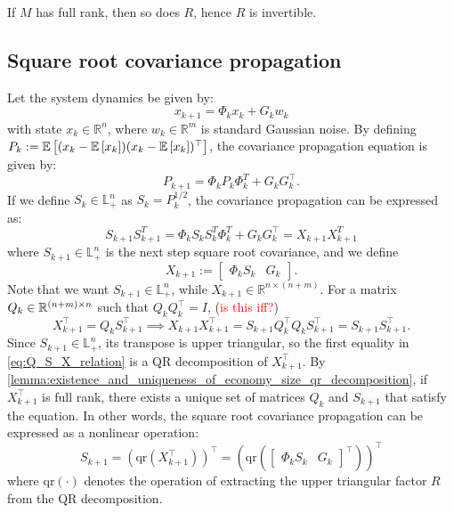 \documentclass{IEEEtran}
\begin{document}
\begin{remark}
	If \(M\) has full rank, then so does \(R\), hence \(R\) is invertible.
\end{remark}

\subsection{Square root covariance propagation}%
Let the system dynamics be given by:
\begin{equation}
	x_{k+1} = \Phi_k x_k + G_k w_k
\end{equation}
with state \( x_k \in \mathbb{R}^n \), where \( w_k \in \mathbb{R}^m \) is standard Gaussian noise.
By defining $P_k := \mathbb{E}\left[(x_k - \mathbb{E}\left[x_k\right])(x_k - \mathbb{E}\left[x_k\right])^\top\right]$, the covariance propagation equation is given by:
\begin{equation}
	P_{k+1} = \Phi_k P_k \Phi_k^T + G_k G_k^\top.
\end{equation}
If we define \( S_k \in \mathbb{L}_+^n \) as \( S_k = P_k^{1/2} \), the covariance propagation can be expressed as:
\begin{equation}
	S_{k+1} S_{k+1}^T = \Phi_k S_k S_k^T \Phi_k^T + G_k G_k^\top = X_{k+1} X_{k+1}^T
\end{equation}
where $S_{k+1} \in \mathbb{L}_+^n$ is the next step square root covariance, and we define
\begin{equation}
	X_{k+1} := \begin{bmatrix} \Phi_k S_k & G_k \end{bmatrix}.
\end{equation}
Note that we want $S_{k+1} \in \mathbb{L}_+^n$, while $X_{k+1} \in \mathbb{R}^{n \times (n+m)}$.
For a matrix $Q_{k} \in \mathbb{R}^{(n+m) \times n}$ such that $Q_{k} Q_{k}^\top = I$, (\textcolor{red}{is this iff?})
\begin{equation} \label{eq:Q_S_X_relation}
     X_{k+1}^\top = Q_{k} S_{k+1}^\top
	\implies
	X_{k+1} X_{k+1}^\top = S_{k+1} Q_{k}^\top Q_{k} S_{k+1}^\top = S_{k+1} S_{k+1}^\top.
\end{equation}
Since $S_{k+1} \in \mathbb{L}_+^n$, its transpose is upper triangular, so the first equality in \cref{eq:Q_S_X_relation} is a QR decomposition of $X_{k+1}^\top$. By \cref{lemma:existence_and_uniqueness_of_economy_size_qr_decomposition}, if $X_{k+1}^\top$ is full rank, there exists a unique set of matrices $Q_{k}$ and $S_{k+1}$ that satisfy the equation.
In other words, the square root covariance propagation can be expressed as a nonlinear operation:
\begin{equation} \label{eq:square_root_covariance_propagation_nonlinear}
	S_{k+1} = (\mathrm{qr}(X_{k+1}^\top))^\top = (\mathrm{qr}( \begin{bmatrix} \Phi_k S_k & G_k \end{bmatrix} ^\top))^\top
\end{equation}
where \( \mathrm{qr}(\cdot) \) denotes the operation of extracting the upper triangular factor \( R \) from the QR decomposition. 
\end{document}
